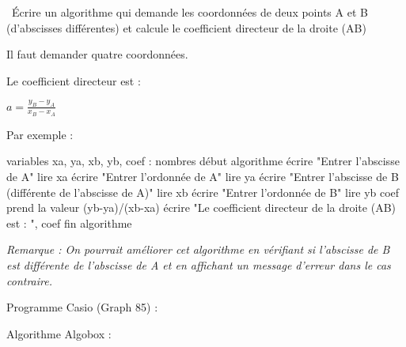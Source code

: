 
%
\
Écrire un algorithme qui demande les coordonnées de deux points A et B (d'abscisses différentes) et calcule le coefficient directeur de la droite (AB)
\begin{corrige}
     Il faut demander quatre coordonnées.
     \par
     Le coefficient directeur est :
     \par
     $a=\frac{y_B-y_A}{x_B-x_A}$
     \par
     Par exemple :
     \begin{code}
   variables
       xa, ya, xb, yb, coef : nombres
   début algorithme
       écrire "Entrer l'abscisse de A"
       lire xa
       écrire "Entrer l'ordonnée de A"
       lire ya
       écrire "Entrer l'abscisse de B (différente de l'abscisse de A)"
       lire xb
       écrire "Entrer l'ordonnée de B"
       lire yb
       coef prend la valeur (yb-ya)/(xb-xa)
       écrire "Le coefficient directeur de la droite (AB) est : ", coef
   fin algorithme
     \end{code}
     \textit{Remarque : On pourrait améliorer cet algorithme en vérifiant si l'abscisse de B est différente de l'abscisse de A et en affichant un message d'erreur dans le cas contraire.}
\par
     Programme Casio (Graph 85) :
\par
{}%
\par
     Algorithme Algobox :
\par
{}%
\end{corrige}
